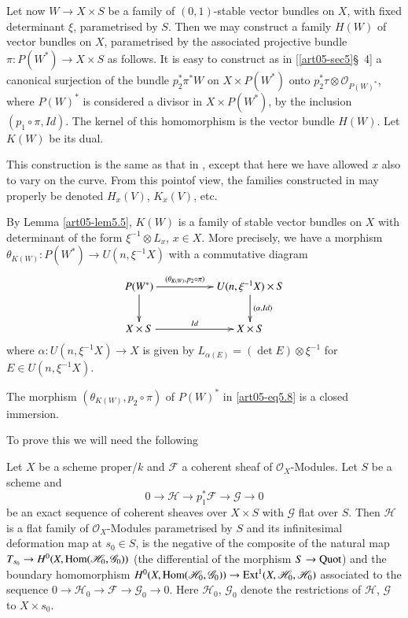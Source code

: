 Let now $W\to X\times S$ be a family of $(0,1)$-stable vector bundles
on $X$, with fixed determinant $\xi$, parametrised by $S$. Then we may
construct a family $H(W)$ of vector bundles on $X$, parametrised by
the associated projective bundle $\pi:P(W^{*})\to X\times S$ as
follows. It is easy to construct as in  [\ref{art05-sec5}\S\ 4] a
canonical surjection of the bundle $p^{*}_{2}\pi^{*}W$ on $X\times
P(W^{*})$ onto $p^{*}_{2}\tau\otimes \mathscr{O}_{P(W)^*}$, where
$P(W)^{*}$ is considered a divisor in $X\times P(W^{*})$, by the
inclusion $(p_{1}\circ \pi, Id)$. The kernel of this homomorphism is
the vector bundle $H(W)$. Let $K(W)$ be its dual.

\begin{remark}\label{art05-rem5.7}
This construction is the same as that in \cite{art05-key5}, except
that here we have allowed $x$ also to vary on the curve. From this
point\pageoriginale of view, the families constructed
in \cite{art05-key5} may properly be denoted $H_{x}(V)$, $K_{x}(V)$,
etc. 
\end{remark}

By Lemma \ref{art05-lem5.5}, $K(W)$ is a family of stable vector
bundles on $X$ with determinant of the form $\xi^{-1}\otimes L_{x}$,
$x\in X$. More precisely, we have a morphism
$\theta_{K(W)}:P(W^{*})\to U(n,\xi^{-1}X)$ with a commutative diagram
\setcounter{equation}{7}
\begin{equation}
\vcenter{
\xymatrix@C=1.8cm{
P(W^{*})\ar[d]\ar[r]^-{(\theta_{K(W)},p_{2}\circ \pi)} &
U(n,\xi^{-1}X)\times S\ar[d]^-{(\alpha,Id)}\\
X\times S\ar[r]^-{Id} & X\times S
}}\label{art05-eq5.8}
\end{equation}
where $\alpha:U(n,\xi^{-1}X)\to X$ is given by $L_{\alpha(E)}=(\det
E)\otimes \xi^{-1}$ for $E\in U(n,\xi^{-1}X)$. 

\setcounter{theorem}{8}
\begin{lemma}\label{art05-lem5.9}
The morphism $(\theta_{K(W)}, p_{2}\circ \pi)$ of $P(W)^{*}$
in \eqref{art05-eq5.8} is a closed immersion.
\end{lemma}

To prove this we will need the following

\begin{lemma}\label{art05-lem5.10}
Let $X$ be a scheme proper/$k$ and $\mathscr{F}$ a coherent sheaf of
$\mathscr{O}_{X}$-Modules. Let $S$ be a scheme and
$$
0\to \mathscr{H}\to p^{*}_{1}\mathscr{F}\to \mathscr{G}\to 0
$$
be an exact sequence of coherent sheaves over $X\times S$ with
$\mathscr{G}$ flat over $S$. Then $\mathscr{H}$ is a flat family of
$\mathscr{O}_{X}$-Modules parametrised by $S$ and its infinitesimal
deformation map at $s_{0}\in S$, is the negative of the composite of
the natural map $T_{s_{0}}\to
H^{0}(X,\operatorname{Hom}(\mathscr{H}_{0},\mathscr{G}_{0}))$ (the differential of
the morphism $S\to \operatorname{Quot}$) and the boundary homomorphism $H^{0}(X,\operatorname{Hom}
(\mathscr{H}_{0},\mathscr{G}_{0}))\to \operatorname{Ext}^{1}(X,\mathscr{H}_{0},\mathscr{H}_{0})$
associated to the sequence
$0\to \mathscr{H}_{0}\to \mathscr{F}\to \mathscr{G}_{0}\to 0$. Here
$\mathscr{H}_{0}$, $\mathscr{G}_{0}$ denote the restrictions of
$\mathscr{H}$, $\mathscr{G}$ to $X\times s_{0}$.
\end{lemma}


